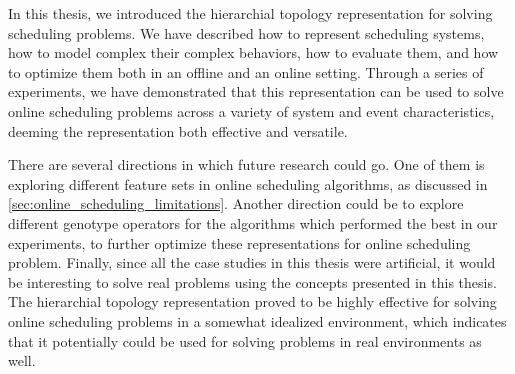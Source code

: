 In this thesis, we introduced the hierarchial topology representation for solving scheduling problems. We have described how to represent scheduling systems, how to model complex their complex behaviors, how to evaluate them, and how to optimize them both in an offline and an online setting. Through a series of experiments, we have demonstrated that this representation can be used to solve online scheduling problems across a variety of system and event characteristics, deeming the representation both effective and versatile.

There are several directions in which future research could go. One of them is exploring different feature sets in online scheduling algorithms, as discussed in \ref{sec:online_scheduling_limitations}. Another direction could be to explore different genotype operators for the algorithms which performed the best in our experiments, to further optimize these representations for online scheduling problem. Finally, since all the case studies in this thesis were artificial, it would be interesting to solve real problems using the concepts presented in this thesis. The hierarchial topology representation proved to be highly effective for solving online scheduling problems in a somewhat idealized environment, which indicates that it potentially could be used for solving problems in real environments as well.